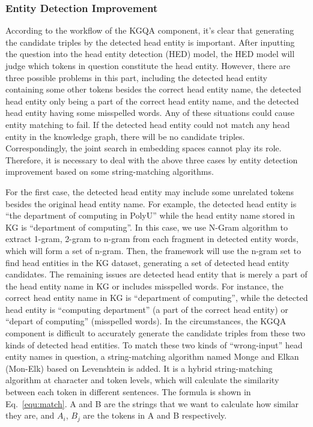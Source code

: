 \documentclass[11pt]{article}
\begin{document}
\subsubsection{Entity Detection Improvement}\label{sec:Entity Detection Improvement}
According to the workflow of the KGQA component, it's clear that generating the candidate triples by the detected head entity is important. After inputting the question into the head entity detection (HED) model, the HED model will judge which tokens in question constitute the head entity. However, there are three possible problems in this part, including the detected head entity containing some other tokens besides the correct head entity name, the detected head entity only being a part of the correct head entity name, and the detected head entity having some misspelled words. Any of these situations could cause entity matching to fail. If the detected head entity could not match any head entity in the knowledge graph, there will be no candidate triples. Correspondingly, the joint search in embedding spaces cannot play its role. Therefore, it is necessary to deal with the above three cases by entity detection improvement based on some string-matching algorithms.

For the first case, the detected head entity may include some unrelated tokens besides the original head entity name. For example, the detected head entity is ``the department of computing in PolyU'' while the head entity name stored in KG is ``department of computing''. In this case, we use N-Gram \cite{c27} algorithm to extract 1-gram, 2-gram to n-gram from each fragment in detected entity words, which will form a set of n-gram. Then, the framework will use the n-gram set to find head entities in the KG dataset, generating a set of detected head entity candidates. The remaining issues are detected head entity that is merely a part of the head entity name in KG or includes misspelled words. For instance, the correct head entity name in KG is ``department of computing'', while the detected head entity is ``computing department'' (a part of the correct head entity) or ``depart of computing'' (misspelled words). In the circumstances, the KGQA component is difficult to accurately generate the candidate triples from these two kinds of detected head entities. To match these two kinds of ``wrong-input'' head entity names in question, a string-matching algorithm named Monge and Elkan (Mon-Elk) based on Levenshtein \cite{c28} is added. It is a hybrid string-matching algorithm at character and token levels, which will calculate the similarity between each token in different sentences. The formula is shown in Eq.~\eqref{equ:match}. A and B are the strings that we want to calculate how similar they are, and $A_i$, $B_j$ are the tokens in A and B respectively.
\end{document}
